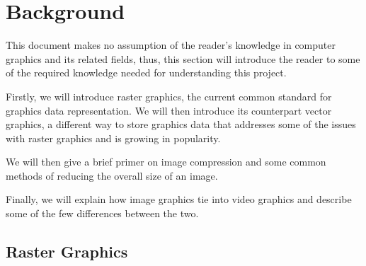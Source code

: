 \documentclass[12pt]{article}
\newcommand{\sentence}{} %
\begin{document}


    \pagebreak


    \section{Background}\label{sec:background}

    \tab
    This document makes no assumption of the reader's knowledge in computer graphics and its related fields,
    thus, this section will introduce the reader to some of the required knowledge needed for understanding this
    project.
    \sentence
    Firstly, we will introduce raster graphics, the current common standard for graphics data representation.
    We will then introduce its counterpart vector graphics, a different way to store graphics data that addresses
    some of the issues with raster graphics and is growing in popularity.
    \sentence
    We will then give a brief primer on image compression and some common methods of reducing the overall size
    of an image.
    \sentence
    Finally, we will explain how image graphics tie into video graphics and describe some of the few differences
    between the two.

    \subsection{Raster Graphics}\label{subsec:raster-graphics}

\end{document}
